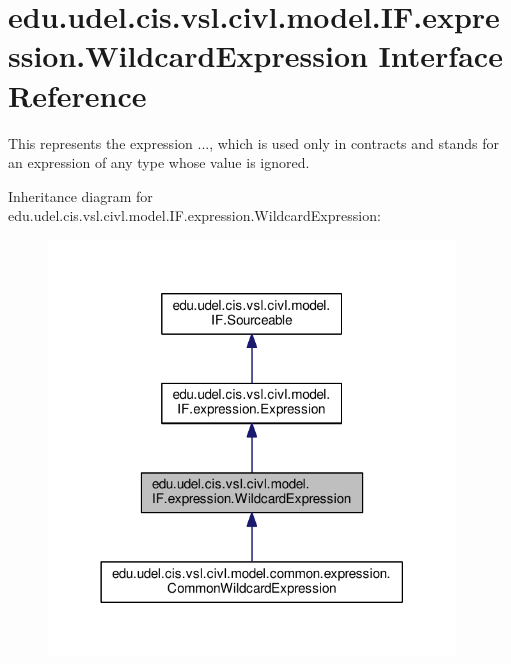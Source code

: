 \hypertarget{interfaceedu_1_1udel_1_1cis_1_1vsl_1_1civl_1_1model_1_1IF_1_1expression_1_1WildcardExpression}{}\section{edu.\+udel.\+cis.\+vsl.\+civl.\+model.\+I\+F.\+expression.\+Wildcard\+Expression Interface Reference}
\label{interfaceedu_1_1udel_1_1cis_1_1vsl_1_1civl_1_1model_1_1IF_1_1expression_1_1WildcardExpression}


This represents the expression {\ttfamily ...}, which is used only in contracts and stands for an expression of any type whose value is ignored.  




Inheritance diagram for edu.\+udel.\+cis.\+vsl.\+civl.\+model.\+I\+F.\+expression.\+Wildcard\+Expression\+:
\nopagebreak
\begin{figure}[H]
\begin{center}
\leavevmode
\includegraphics[width=306pt]{interfaceedu_1_1udel_1_1cis_1_1vsl_1_1civl_1_1model_1_1IF_1_1expression_1_1WildcardExpression__inherit__graph}
\end{center}
\end{figure}



